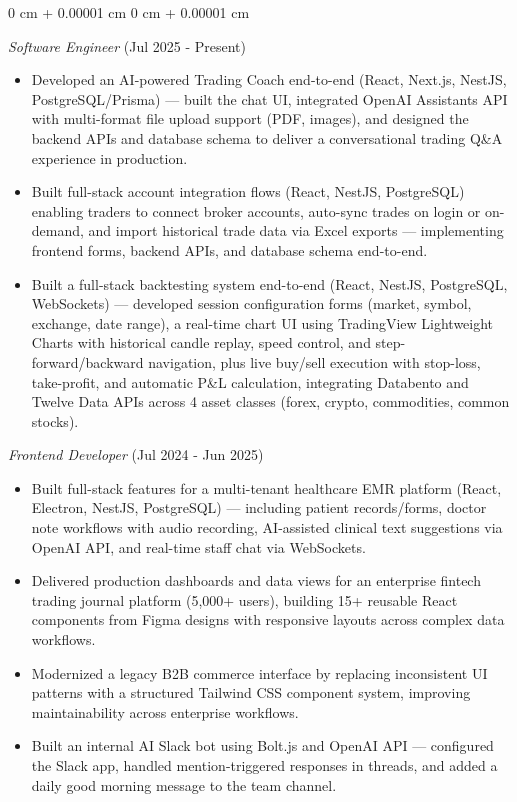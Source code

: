 \documentclass[10pt, letterpaper]{article}
\newenvironment{highlights}{
    \begin{itemize}[
        topsep=0.10 cm,
        parsep=0.10 cm,
        partopsep=0pt,
        itemsep=0pt,
        leftmargin=0 cm + 10pt
    ]
}{
    \end{itemize}
} %
\newenvironment{onecolentry}{
    \begin{adjustwidth}{
        0 cm + 0.00001 cm
    }{
        0 cm + 0.00001 cm
    }
}{
    \end{adjustwidth}
} %
\begin{document}
\vspace{0.10 cm}
\begin{onecolentry}

    \textit{Software Engineer} (Jul 2025 - Present)
    \begin{highlights}
        \item Developed an AI-powered Trading Coach end-to-end (React, Next.js, NestJS, PostgreSQL/Prisma) — built the chat UI, integrated OpenAI Assistants API with multi-format file upload support (PDF, images), and designed the backend APIs and database schema to deliver a conversational trading Q\&A experience in production.
        \item Built full-stack account integration flows (React, NestJS, PostgreSQL) enabling traders to connect broker accounts, auto-sync trades on login or on-demand, and import historical trade data via Excel exports — implementing frontend forms, backend APIs, and database schema end-to-end.
        \item Built a full-stack backtesting system end-to-end (React, NestJS, PostgreSQL, WebSockets) — developed session configuration forms (market, symbol, exchange, date range), a real-time chart UI using TradingView Lightweight Charts with historical candle replay, speed control, and step-forward/backward navigation, plus live buy/sell execution with stop-loss, take-profit, and automatic P\&L calculation, integrating Databento and Twelve Data APIs across 4 asset classes (forex, crypto, commodities, common stocks).
    \end{highlights}

    \vspace{0.10 cm}

    \textit{Frontend Developer} (Jul 2024 - Jun 2025)
    \begin{highlights}
        \item Built full-stack features for a multi-tenant healthcare EMR platform (React, Electron, NestJS, PostgreSQL) — including patient records/forms, doctor note workflows with audio recording, AI-assisted clinical text suggestions via OpenAI API, and real-time staff chat via WebSockets.
        \item Delivered production dashboards and data views for an enterprise fintech trading journal platform (5,000+ users), building 15+ reusable React components from Figma designs with responsive layouts across complex data workflows.
        \item Modernized a legacy B2B commerce interface by replacing inconsistent UI patterns with a structured Tailwind CSS component system, improving maintainability across enterprise workflows.
        \item Built an internal AI Slack bot using Bolt.js and OpenAI API — configured the Slack app, handled mention-triggered responses in threads, and added a daily good morning message to the team channel.
    \end{highlights}


\end{onecolentry}
\end{document}
